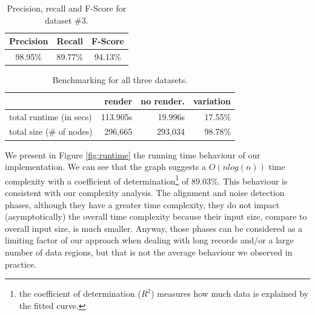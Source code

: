 \vspace{-0.5cm}
\begin{table}[h]
\centering
\caption{\small{Precision, recall and F-Score for dataset $\#3$.}}
\label{table:compare3}
\begin{small}
\begin{tabular}
{| c| c| c|}\hline
	Precision	& Recall	& F-Score\\ \hline
	98.95\% & 89.77\% & 94.13\% \\ \hline
\end{tabular}
\end{small}
\end{table}

\vspace{-0.5cm}
\begin{table}[H]
\centering
\caption{\small{Benchmarking for all three datasets.}}
\label{table:compare4}
\begin{small}
\begin{tabular}
{|l| r| r| r|}\hline
 & render & no render. & variation \\\hline
total runtime (in secs) & 113.905s & 19.996s & 17.55\% \\\hline
total size (\# of nodes) & 296,665 & 293,034 & 98.78\% \\\hline
\end{tabular}
\end{small}
\end{table}

\vspace{-0.3cm}
We present in Figure \ref{fig:runtime} the running time behaviour of our
implementation. We can see that the graph suggests a $O(nlog(n))$ time
complexity with a coefficient of determination\footnote{the coefficient of
determination ($R^2$) measures how much data is explained by the fitted curve.}
of 89.03\%. This behaviour is consistent with our complexity analysis. The
alignment and noise detection phases, although they have a greater time
complexity, they do not impact (asymptotically) the overall time complexity
because their input size, compare to overall input size, is much smaller.
Anyway, those phases can be considered as a limiting factor of our approach when
dealing with long records and/or a large number of data regions, but that is not
the average behaviour we observed in practice.

